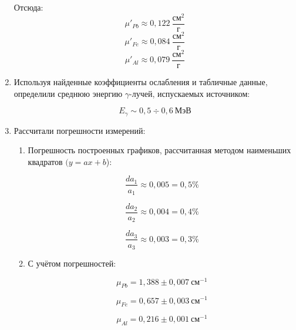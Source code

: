 \documentclass[letterpaper,12pt]{article}
\begin{document}
\begin{enumerate}
		Отсюда:
		\begin{equation}
		\mu'_{Pb} \approx 0,122 ~\frac{\text{см}^2}{\text{г}}
		\end{equation}
		\begin{equation}
		\mu'_{Fe} \approx 0,084 ~\frac{\text{см}^2}{\text{г}}
		\end{equation}
		\begin{equation}
		\mu'_{Al} \approx 0,079 ~\frac{\text{см}^2}{\text{г}}
		\end{equation}
		
		\item 
		Используя найденные коэффициенты ослабления и табличные данные, определили среднюю энергию $\gamma$-лучей, испускаемых источником:
		
		\begin{equation}
		E_{\gamma} \sim 0,5\div0,6 ~\text{МэВ}
		\end{equation}
		
		\item 
		Рассчитали погрешности измерений:
		\begin{enumerate}
			\item 
			Погрешность построенных графиков, рассчитанная методом наименьших квадратов $(y=ax+b$):
			
			\begin{equation*}
			\frac{da_1}{a_1} \approx 0,005 = 0,5\%
			\end{equation*}
			
			\begin{equation*}
			\frac{da_2}{a_2} \approx 0,004 = 0,4\%
			\end{equation*}
			
			\begin{equation*}
			\frac{da_3}{a_3} \approx 0,003 = 0,3\%
			\end{equation*}
			
			
			
			
			
			
			\item 
			С учётом погрешностей:
			
			\begin{equation*}
			\mu_{Pb} = 1,388 \pm 0,007 ~\text{см}^{-1}
			\end{equation*}
			
			\begin{equation*}
			\mu_{Fe} = 0,657 \pm 0,003 ~\text{см}^{-1}
			\end{equation*}
			
			\begin{equation*}
			\mu_{Al} = 0,216 \pm 0,001 ~\text{см}^{-1}
			\end{equation*}
			
			
			
			
			
		\end{enumerate}
		
		
		\end{enumerate}
		
\end{document}
